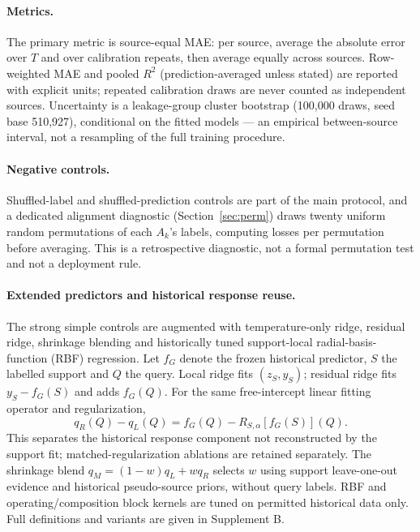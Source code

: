 \documentclass[11pt,a4paper]{article}
\begin{document}
\paragraph{Metrics.} The primary metric is source-equal MAE: per source, average the
absolute error over $T$ and over calibration repeats, then average equally across
sources. Row-weighted MAE and pooled $R^2$ (prediction-averaged unless stated) are
reported with explicit units; repeated calibration draws are never counted as independent
sources. Uncertainty is a leakage-group cluster bootstrap (100{,}000 draws, seed base
510{,}927), conditional on the fitted models --- an empirical between-source interval,
not a resampling of the full training procedure.

\paragraph{Negative controls.} Shuffled-label and shuffled-prediction controls are part
of the main protocol, and a dedicated alignment diagnostic (Section~\ref{sec:perm})
draws twenty uniform random permutations of each $A_k$'s labels, computing losses per
permutation before averaging. This is a retrospective diagnostic, not a formal
permutation test and not a deployment rule.


\paragraph{Extended predictors and historical response reuse.}
The strong simple controls are augmented with temperature-only ridge, residual ridge, shrinkage blending and historically tuned support-local radial-basis-function (RBF) regression.
Let $f_G$ denote the frozen historical predictor, $S$ the labelled support and $Q$ the query.
Local ridge fits $(z_S,y_S)$; residual ridge fits $y_S-f_G(S)$ and adds $f_G(Q)$.
For the same free-intercept linear fitting operator and regularization,
\begin{equation}\label{eq:ext_projection}
q_R(Q)-q_L(Q)=f_G(Q)-R_{S,\alpha}[f_G(S)](Q).
\end{equation}
This separates the historical response component not reconstructed by the support fit; matched-regularization ablations are retained separately.
The shrinkage blend $q_M=(1-w)q_L+wq_R$ selects $w$ using support leave-one-out evidence and historical pseudo-source priors, without query labels.
RBF and operating/composition block kernels are tuned on permitted historical data only. Full definitions and variants are given in Supplement B.
\end{document}
